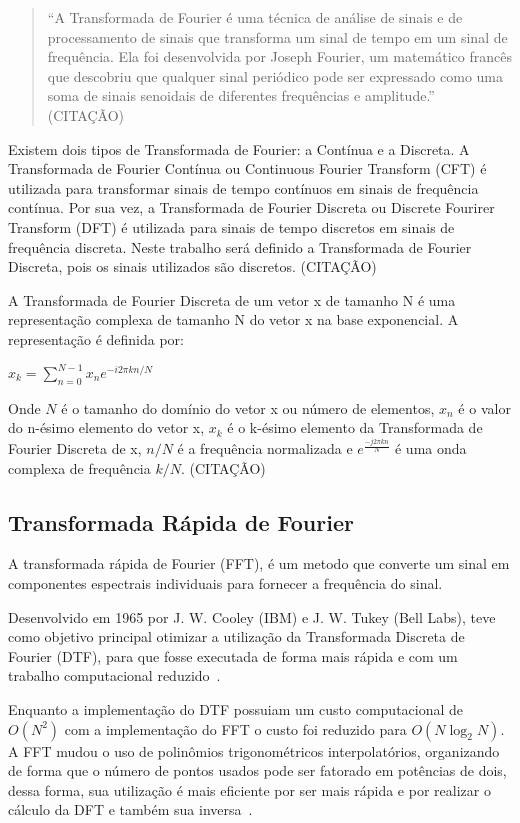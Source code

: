 \documentclass{sbrt}
\begin{document}
\begin{quote}
  ``A Transformada de Fourier é uma técnica de análise de sinais e de processamento de sinais que transforma um sinal de tempo em um sinal de frequência. Ela foi desenvolvida por Joseph Fourier, um matemático francês que descobriu que qualquer sinal periódico pode ser expressado como uma soma de sinais senoidais de diferentes frequências e amplitude.'' (CITAÇÃO)
\end{quote}

Existem dois tipos de Transformada de Fourier: a Contínua e a Discreta. A Transformada de Fourier Contínua ou Continuous Fourier Transform (CFT) é utilizada para transformar sinais de tempo contínuos em sinais de frequência contínua. Por sua vez, a Transformada de Fourier Discreta ou Discrete Fourirer Transform (DFT) é utilizada para sinais de tempo discretos em sinais de frequência discreta. Neste trabalho será definido a Transformada de Fourier Discreta, pois os sinais utilizados são discretos. (CITAÇÃO)

A Transformada de Fourier Discreta de um vetor x de tamanho N é uma representação complexa de tamanho N do vetor x na base exponencial. A representação é definida por:

\begin{center}
  $x_k = \sum_{n=0}^{N-1} x_n e^{-i 2\pi kn/N}$
\end{center}

Onde $N$ é o tamanho do domínio do vetor x ou número de elementos, $x_n$ é o valor do n-ésimo elemento do vetor x, $x_k$ é o k-ésimo elemento da Transformada de Fourier Discreta de x, $n/N$ é a frequência normalizada e $e^{\frac{-j 2 \pi k n}{N}}$ é uma onda complexa de frequência $k/N$. (CITAÇÃO)

\subsection{Transformada Rápida de Fourier}

A transformada rápida de Fourier (FFT), é um metodo que  converte um sinal em componentes espectrais individuais para fornecer a frequência do sinal.

Desenvolvido em 1965 por  J. W. Cooley (IBM) e J. W. Tukey (Bell Labs), teve como objetivo principal otimizar a utilização da Transformada Discreta de Fourier (DTF), para que fosse executada de forma mais rápida e com um trabalho computacional reduzido~\cite{martins2016analise}.

Enquanto a implementação do DTF possuiam um custo computacional de $O(N^2)$ com a implementação do FFT o custo foi reduzido para $O(N \log_2{N})$. A FFT mudou o uso de polinômios trigonométricos interpolatórios, organizando de forma que o número de pontos usados pode ser fatorado em potências de dois, dessa forma, sua utilização é mais eficiente por ser mais rápida e por realizar o cálculo da DFT e também sua inversa~\cite{reis2008implementaccao}.
\end{document}
